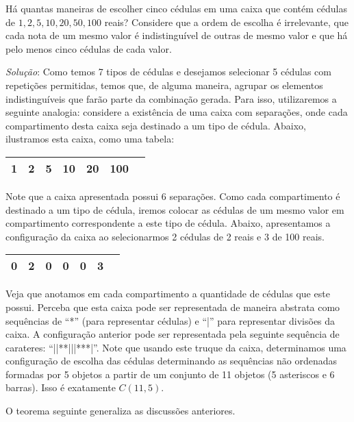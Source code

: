 \begin{Example}
Há quantas maneiras de escolher cinco cédulas em uma caixa que contém
cédulas de $1,2,5,10,20,50,100$ reais? Considere que a ordem de
escolha é irrelevante, que cada nota de um mesmo valor é
indistinguível de outras de mesmo valor e que há pelo menos cinco
cédulas de cada valor.

\textit{Solução}:
Como temos 7 tipos de cédulas e desejamos selecionar 5 cédulas com
repetições permitidas, temos que, de alguma maneira, agrupar os
elementos indistinguíveis que farão parte da combinação gerada. Para
isso, utilizaremos a seguinte analogia: considere a existência de uma
caixa com separações, onde cada compartimento desta caixa seja
destinado a um tipo de cédula. Abaixo, ilustramos esta caixa, como uma
tabela:

\begin{table}[h]
\begin{tabular}{|c|c|c|c|c|c|c|}
\hline
1 & 2 & 5 &10 & 20 & 100 \\ \hline
\end{tabular}
\centering
\end{table}

Note que a caixa apresentada possui 6 separações. Como cada
compartimento é destinado a um tipo de cédula, iremos colocar as
cédulas de um mesmo valor em compartimento correspondente a este tipo
de cédula. Abaixo, apresentamos a configuração da caixa ao
selecionarmos 2 cédulas de 2 reais e 3 de 100 reais.

\begin{table}[h]
\begin{tabular}{|c|c|c|c|c|c|c|}
\hline
0 & 2 & 0 & 0 & 0 & 3 \\ \hline
\end{tabular}
\centering
\end{table}

Veja que anotamos em cada compartimento a quantidade de cédulas que
este possui. Perceba que esta caixa pode ser representada de maneira
abstrata como sequências de ``*'' (para representar cédulas) e ``|''
para representar divisões da caixa. A configuração anterior pode ser
representada pela seguinte sequência de carateres:
``||**|||***|''. Note que usando este truque da caixa, determinamos
uma configuração de escolha das cédulas determinando as sequências não
ordenadas formadas por 5 objetos a partir de um conjunto de 11 objetos
(5 asteriscos e 6 barras). Isso é exatamente $C(11,5)$.
\end{Example}
O teorema seguinte generaliza as discussões anteriores.
